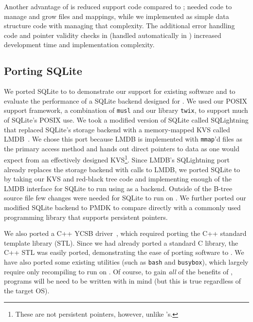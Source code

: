 {    Another advantage of \nvrbt is reduced support code compared to \unixrbt; \unixrbt needed
    code to manage and grow files and mappings, while we implemented \nvrbt as simple data structure code
    with \Twizzler managing that complexity. The additional error handling code and pointer
    validity checks in \unixrbt (handled automatically in \Twizzler) increased development time
    and implementation complexity.


    \subsection{Porting SQLite}

    We ported SQLite to \Twizzler to demonstrate our support for existing software and to evaluate the
    performance of a SQLite backend designed for \Twizzler. We used
    our POSIX support framework, a combination of \texttt{musl} and our library
    \texttt{twix}, to support much of SQLite's POSIX use.
    We took a modified version of SQLite called SQLightning that replaced
    SQLite's storage backend with a memory-mapped KVS called LMDB~\cite{lmdb}.
    We chose this port
    because LMDB is implemented with \texttt{mmap}'d files as the primary access method and hands out
    direct pointers to data as one would expect from an effectively designed \NVM KVS\footnote{These
        are not persistent pointers, however, unlike \Twizzler's.}.
    Since LMDB's SQLightning port already replaces the storage backend
    with calls to
    LMDB, we ported SQLite to \Twizzler by taking our KVS and red-black tree code and implementing
    enough of the LMDB interface for SQLite to run using \Twizzler as a backend.
    Outside of the
    B-tree source file few changes were needed for
    SQLite to run on \Twizzler. We further ported our modified SQLite backend to PMDK to compare
    directly with a commonly used \NVM programming library that supports persistent pointers.

    We also ported a C++ YCSB driver~\cite{ycsbc}, which required porting the C++ standard template
    library (STL). Since we had already ported a standard C library, the C++ STL was easily ported,
    demonstrating the ease of porting software to \Twizzler.
    We have also ported some existing \unix utilities (such as \texttt{bash} and
    \texttt{busybox}), which largely require only recompiling to run on \Twizzler. Of
    course, to gain \emph{all} of the benefits of \Twizzler, programs will be need to be
    written with \NVM in mind (but this is true regardless of the target OS).

}
